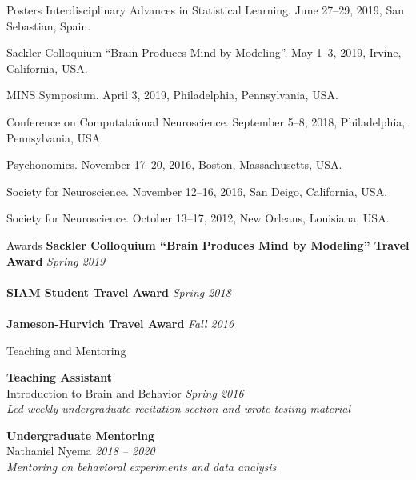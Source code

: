 \documentclass{resume} %
\begin{document}
\begin{rSection}{Posters}
Interdisciplinary Advances in Statistical Learning. June 27--29, 2019, San Sebastian, Spain.

Sackler Colloquium ``Brain Produces Mind by Modeling''. May 1--3, 2019, Irvine, California, USA.

MINS Symposium. April 3, 2019, Philadelphia, Pennsylvania, USA.

Conference on Computataional Neuroscience. September 5--8, 2018, Philadelphia, Pennsylvania, USA.

Psychonomics. November 17--20, 2016, Boston, Massachusetts, USA.

Society for Neuroscience. November 12--16, 2016, San Deigo, California, USA.

Society for Neuroscience. October 13--17, 2012, New Orleans, Louisiana, USA.
\end{rSection}

\begin{rSection}{Awards}
    \textbf{Sackler Colloquium ``Brain Produces Mind by Modeling'' Travel Award} \hfill \emph{Spring 2019} \\
    \\
    \textbf{SIAM Student Travel Award} \hfill \emph{Spring 2018} \\
    \\
    \textbf{Jameson-Hurvich Travel Award} \hfill \emph{Fall 2016} \\
\end{rSection}


\begin{rSection}{Teaching and Mentoring}

\textbf{Teaching Assistant} \\
Introduction to Brain and Behavior \hfill \emph{Spring 2016} \\
\emph{Led weekly undergraduate recitation section and wrote testing material}

\textbf{Undergraduate Mentoring} \\
Nathaniel Nyema \hfill \emph{2018 -- 2020} \\
\emph{Mentoring on behavioral experiments and data analysis}
\end{rSection}
\end{document}

